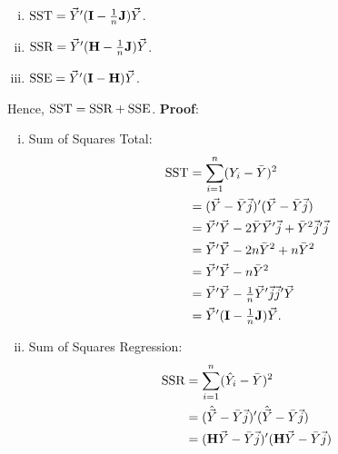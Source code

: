 \begin{Theorem}{}{}
    \begin{enumerate}[(i)]
        \item $ \text{SST}=\vec{Y}'(\mathbf{I}-\tfrac{1}{n}\mathbf{J})\vec{Y} $.
        \item $ \text{SSR}=\vec{Y}'(\mathbf{H}-\tfrac{1}{n}\mathbf{J})\vec{Y} $.
        \item $ \text{SSE}=\vec{Y}'(\mathbf{I}-\mathbf{H})\vec{Y} $.
    \end{enumerate}
    Hence, $ \text{SST}=\text{SSR}+\text{SSE} $.
    \tcblower{}
    \textbf{Proof}:
    \begin{enumerate}[(i)]
        \item Sum of Squares Total:
              \begin{align*}
                  \text{SST}
                   & =\sum_{i=1}^{n}(Y_i-\bar{Y})^2                                                       \\
                   & =(\vec{Y}-\bar{Y}\vec{j})'(\vec{Y}-\bar{Y}\vec{j})                       \\
                   & =\vec{Y}'\vec{Y}-2\bar{Y}\vec{Y}'\vec{j}+\bar{Y}^2 \vec{j}'\vec{j} \\
                   & =\vec{Y}'\vec{Y}-2n\bar{Y}^2+n\bar{Y}^2                                        \\
                   & =\vec{Y}'\vec{Y}-n\bar{Y}^2                                                    \\
                   & =\vec{Y}'\vec{Y}-\tfrac{1}{n}\vec{Y}'\vec{j}\vec{j}'\vec{Y}        \\
                   & =\vec{Y}'(\mathbf{I}-\tfrac{1}{n}\mathbf{J})\vec{Y}.
              \end{align*}
        \item Sum of Squares Regression:
              \begin{align*}
                  \SSR
                   & =\sum_{i=1}^{n}(\hat{Y}_i-\bar{Y})^2                                                                                                             \\
                   & =(\hat{\Vector{Y}}-\bar{Y}\Vector{j})'(\hat{\Vector{Y}}-\bar{Y}\Vector{j})                                                                       \\
                   & =(\Matrix{H}\Vector{Y}-\bar{Y}\Vector{j})'(\Matrix{H}\Vector{Y}-\bar{Y}\Vector{j})                                                               \\

\end{align*}
\end{enumerate}
\end{Theorem}
